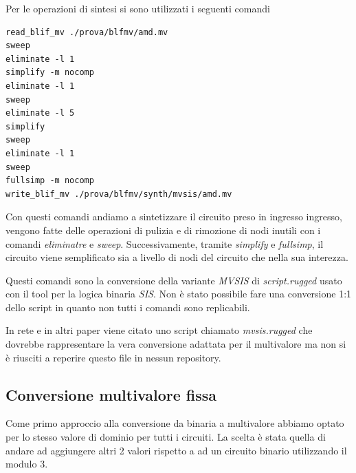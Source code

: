 \documentclass[
  italian,
]{book}
\begin{document}
Per le operazioni di sintesi si sono utilizzati i seguenti comandi

\begin{verbatim}
read_blif_mv ./prova/blfmv/amd.mv
sweep
eliminate -l 1
simplify -m nocomp
eliminate -l 1
sweep
eliminate -l 5
simplify
sweep
eliminate -l 1
sweep
fullsimp -m nocomp
write_blif_mv ./prova/blfmv/synth/mvsis/amd.mv
\end{verbatim}

Con questi comandi andiamo a sintetizzare il circuito preso in ingresso ingresso, vengono fatte delle operazioni di pulizia e di rimozione di nodi inutili con i comandi \emph{eliminatre} e \emph{sweep}. Successivamente, tramite \emph{simplify} e \emph{fullsimp}, il circuito viene semplificato sia a livello di nodi del circuito che nella sua interezza.

Questi comandi sono la conversione della variante \emph{MVSIS} di \emph{script.rugged} usato con il tool per la logica binaria \emph{SIS}. Non è stato possibile fare una conversione 1:1 dello script in quanto non tutti i comandi sono replicabili.

In rete e in altri paper viene citato uno script chiamato \emph{mvsis.rugged} che dovrebbe rappresentare la vera conversione adattata per il multivalore ma non si è riusciti a reperire questo file in nessun repository.

\newpage

\hypertarget{conversione-multivalore-fissa}{%
\subsection{Conversione multivalore fissa}\label{conversione-multivalore-fissa}}

Come primo approccio alla conversione da binaria a multivalore abbiamo optato per lo stesso valore di dominio per tutti i circuiti. La scelta è stata quella di andare ad aggiungere altri 2 valori rispetto a ad un circuito binario utilizzando il modulo 3.
\end{document}
